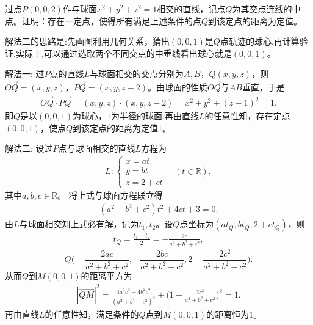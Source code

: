 \documentclass[../../main.tex]{subfiles}%
\begin{document}
\begin{example}
过点$P(0,0,2)$作与球面$x^2+y^2+z^2=1$相交的直线，记点$Q$为其交点连线的中点。证明：存在一定点，使得所有满足上述条件的点$Q$到该定点的距离为定值。
\end{example}
\begin{note}
解法二的思路是:先画图利用几何关系，猜出$(0,0,1)$是$Q$点轨迹的球心,再计算验证.实际上,可以通过选取两个不同交点的中垂线看出球心就是$(0,0,1)$。
\end{note}
\begin{solution}

{\color{blue}解法一:}
过$P$点的直线$L$与球面相交的交点分别为$A,B$，$Q(x,y,z)$，则$\overrightarrow{OQ}=(x,y,z)$，$\overrightarrow{PQ}=(x,y,z-2)$。由球面的性质$\overrightarrow{OQ}$与$AB$垂直，于是
\begin{align*}
\overrightarrow{OQ}\cdot \overrightarrow{PQ}=(x,y,z)\cdot(x,y,z-2)=x^2+y^2+(z-1)^2=1.
\end{align*}
即$Q$是以$(0,0,1)$为球心，$1$为半径的球面.再由直线$L$的任意性知，存在定点$(0,0,1)$，使点$Q$到该定点的距离为定值$1$。

{\color{blue}解法二:}
设过$P$点与球面相交的直线$L$方程为
\begin{align*}
L:\begin{cases}
x=at\\
y=bt\\
z=2+ct
\end{cases}\quad (t\in\mathbb{R}),
\end{align*}
其中$a,b,c\in\mathbb{R}$。
将上式与球面方程联立得
\begin{align*}
(a^2+b^2+c^2)t^2+4ct+3=0.
\end{align*}
由$L$与球面相交知上式必有解，记为$t_1,t_2$。设$Q$点坐标为$(at_Q,bt_Q,2+ct_Q)$，则
\begin{align*}
t_Q=\frac{t_1+t_2}{2}=-\frac{2c}{a^2+b^2+c^2},
\end{align*}
\[
Q\biggl(-\frac{2ac}{a^2+b^2+c^2},-\frac{2bc}{a^2+b^2+c^2},2-\frac{2c^2}{a^2+b^2+c^2}\biggr).
\]
从而$Q$到$M(0,0,1)$的距离平方为
\begin{align*}
|\overrightarrow{QM}|^2=\frac{4a^2c^2+4b^2c^2}{(a^2+b^2+c^2)^2}+\biggl(1-\frac{2c^2}{a^2+b^2+c^2}\biggr)^2=1.
\end{align*}
再由直线$L$的任意性知，满足条件的$Q$点到$M(0,0,1)$的距离恒为$1$。
\end{solution}
\end{document}
